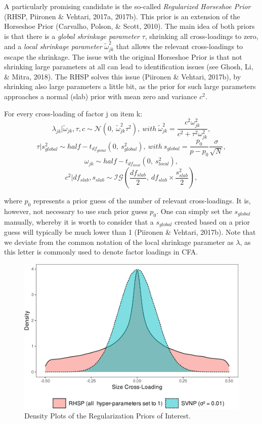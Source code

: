 \documentclass[
  man,floatsintext]{apa6}
\begin{document}
A particularly promising candidate is the so-called \emph{Regularized Horseshoe Prior} (RHSP, Piironen \& Vehtari, 2017a, 2017b). This prior is an extension of the Horseshoe Prior (Carvalho, Polson, \& Scott, 2010). The main idea of both priors is that there is a \emph{global shrinkage parameter} \(\tau\), shrinking all cross-loadings to zero, and a \emph{local shrinkage parameter} \(\tilde{\omega}_{jk}^2\) that allows the relevant cross-loadings to escape the shrinkage. The issue with the original Horseshoe Prior is that not shrinking large parameters at all can lead to identification issues (see Ghosh, Li, \& Mitra, 2018). The RHSP solves this issue (Piironen \& Vehtari, 2017b), by shrinking also large parameters a little bit, as the prior for such large parameters approaches a normal (slab) prior with mean zero and variance \(c^2\).

For every cross-loading of factor j on item k:
\[\lambda_{jk} | \tilde{\omega}_{jk}, \tau, c\sim \mathcal{N}(0, \ \tilde{\omega}^2_{jk} \tau^2), \ with \ \tilde{\omega}^2_{jk} = \frac{c^2\omega_{jk}^2}{c^2 + \tau^2 \omega_{jk}^2},\]
\[\tau | s_{global}^2 \sim half-t_{df_{global}}(0,\  s_{global}^2), \ with \  s_{global} = \frac{p_0}{p-p_0}\frac{\sigma}{\sqrt{N}},\]
\[\omega_{jk} \sim half-t_{df_{local}}(0, \ s_{local}^2),\]
\[c^2 | df_{slab}, s_{slab} \sim \mathcal{IG}(\frac{df_{slab}}{2}, \  df_{slab} \times \frac{s_{slab}^2}{2}),\]

where \(p_0\) represents a prior guess of the number of relevant cross-loadings. It is, however, not necessary to use such prior guess \(p_0\). One can simply set the \(s_{global}\) manually, whereby it is worth to consider that a \(s_{global}\) created based on a prior guess will typically be much lower than 1 (Piironen \& Vehtari, 2017b). Note that we deviate from the common notation of the local shrinkage parameter as \(\lambda\), as this letter is commonly used to denote factor loadings in CFA.

\begin{figure}
\centering
\includegraphics{JMBKoch_report_files/figure-latex/unnamed-chunk-1-1.pdf}
\caption{\label{fig:unnamed-chunk-1}Density Plots of the Regularization Priors of Interest.}
\end{figure}
\end{document}
